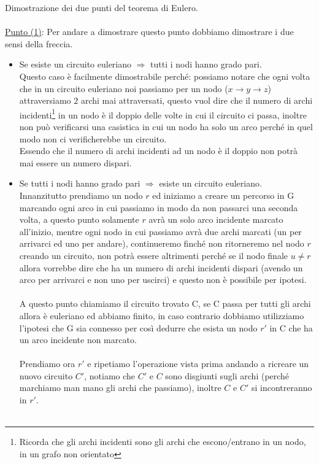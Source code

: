 \begin{demostration}
Dimostrazione dei due punti del teorema di Eulero.\\\\
\underline{Punto (1)}: Per andare a dimostrare questo punto dobbiamo dimostrare i due sensi della freccia.
\begin{itemize}
    \item Se esiste un circuito euleriano $\Longrightarrow$ tutti i nodi hanno grado pari.\\
    Questo caso è facilmente dimostrabile perché: possiamo notare che ogni volta che in un circuito euleriano noi passiamo per un nodo ($x \to y \to z$) attraversiamo $2$ archi mai attraversati, questo vuol dire che il numero di archi incidenti\footnote{Ricorda che gli archi incidenti sono gli archi che escono/entrano in un nodo, in un grafo non orientato} in un nodo è il doppio delle volte in cui il circuito ci passa, inoltre non può verificarsi una casistica in cui un nodo ha solo un arco perché in quel modo non ci verificherebbe un circuito.\\ Essendo che il numero di archi incidenti ad un nodo è il doppio non potrà mai essere un numero dispari.
    \item Se tutti i nodi hanno grado pari $\Longrightarrow$ esiste un circuito euleriano.\\
    Innanzitutto prendiamo un nodo $r$ ed iniziamo a creare un percorso in G marcando ogni arco in cui passiamo in modo da non passarci una seconda volta, a questo punto solamente $r$ avrà un solo arco incidente marcato all'inizio, mentre ogni nodo in cui passiamo avrà due archi marcati (un per arrivarci ed uno per andare), continueremo finché non ritorneremo nel nodo $r$ creando un circuito, non potrà essere altrimenti perché se il nodo finale $u \neq r$ allora vorrebbe dire che ha un numero di archi incidenti dispari (avendo un arco per arrivarci e non uno per uscirci) e questo non è possibile per ipotesi.\\\\
    A questo punto chiamiamo il circuito trovato C, se C passa per tutti gli archi allora è euleriano ed abbiamo finito, in caso contrario dobbiamo utilizziamo l'ipotesi che G sia connesso per così dedurre che esista un nodo $r'$ in C che ha un arco incidente non marcato.\\\\ 
    Prendiamo ora $r'$ e ripetiamo l'operazione vista prima andando a ricreare un nuovo circuito $C'$, notiamo che $C'$ e $C$ sono disgiunti sugli archi (perché marchiamo man mano gli archi che passiamo), inoltre $C$ e $C'$ si incontreranno in $r'$. \\\\

\end{itemize}
\end{demostration}

